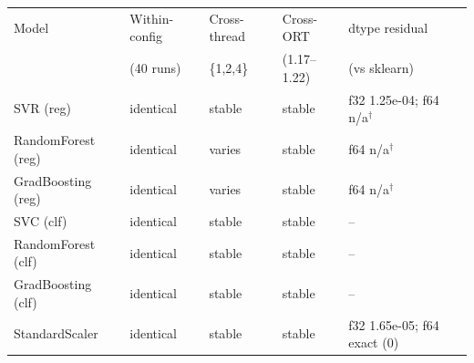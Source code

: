 \begin{tabular}{lllll}
\toprule
Model & Within-config & Cross-thread & Cross-ORT & dtype residual \\
 & (40 runs) & \{1,2,4\} & (1.17--1.22) & (vs sklearn) \\
\midrule
SVR (reg) & identical & stable & stable & f32 1.25e-04; f64 n/a$^\dagger$ \\
RandomForest (reg) & identical & varies & stable & f64 n/a$^\dagger$ \\
GradBoosting (reg) & identical & varies & stable & f64 n/a$^\dagger$ \\
SVC (clf) & identical & stable & stable & -- \\
RandomForest (clf) & identical & stable & stable & -- \\
GradBoosting (clf) & identical & stable & stable & -- \\
StandardScaler & identical & stable & stable & f32 1.65e-05; f64 exact (0) \\
\bottomrule
\end{tabular}
